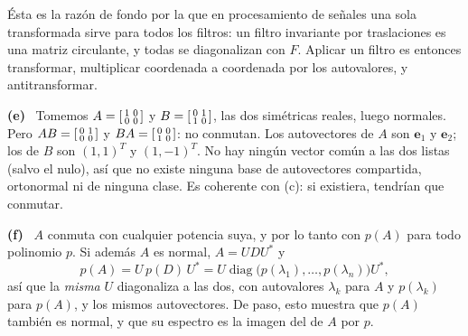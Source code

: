 \documentclass[11pt,a4paper]{article}
\newcommand{\bi}[1]{\boldsymbol{#1}}
\DeclareMathOperator{\diag}{diag}
\newcommand{\itemsol}[1]{\par\medskip\noindent\textbf{(#1)}\ \ignorespaces}
\begin{document}
Ésta es la razón de fondo por la que en procesamiento de señales una sola
transformada sirve para todos los filtros: un filtro invariante por traslaciones
es una matriz circulante, y todas se diagonalizan con $F$. Aplicar un filtro es
entonces transformar, multiplicar coordenada a coordenada por los autovalores, y
antitransformar.

\itemsol{e} Tomemos
$A=\begin{bsmallmatrix}1&0\\0&0\end{bsmallmatrix}$ y
$B=\begin{bsmallmatrix}0&1\\1&0\end{bsmallmatrix}$, las dos simétricas reales,
luego normales. Pero $AB=\begin{bsmallmatrix}0&1\\0&0\end{bsmallmatrix}$ y
$BA=\begin{bsmallmatrix}0&0\\1&0\end{bsmallmatrix}$: no conmutan. Los
autovectores de $A$ son $\bi{e}_1$ y $\bi{e}_2$; los de $B$ son $(1,1)^T$ y
$(1,-1)^T$. No hay ningún vector común a las dos listas (salvo el nulo), así que
no existe ninguna base de autovectores compartida, ortonormal ni de ninguna
clase. Es coherente con (c): si existiera, tendrían que conmutar.

\itemsol{f} $A$ conmuta con cualquier potencia suya, y por lo tanto con $p(A)$
para todo polinomio $p$. Si además $A$ es normal, $A=UDU^{*}$ y
\[
p(A)=U\,p(D)\,U^{*}=U\diag\big(p(\lambda_1),\dots,p(\lambda_n)\big)U^{*},
\]
así que la \emph{misma} $U$ diagonaliza a las dos, con autovalores $\lambda_k$
para $A$ y $p(\lambda_k)$ para $p(A)$, y los mismos autovectores. De paso, esto
muestra que $p(A)$ también es normal, y que su espectro es la imagen del de $A$
por $p$.
\end{document}
